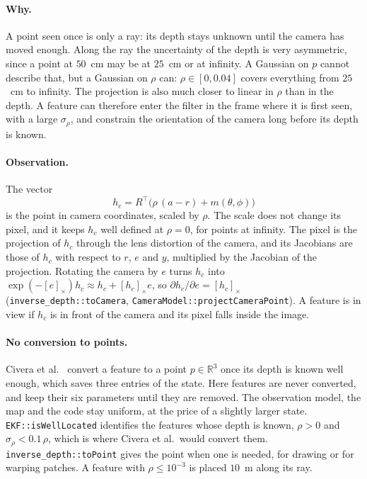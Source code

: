 \documentclass[11pt]{article}
\newcommand{\R}{\mathbb{R}}
\begin{document}
\paragraph{Why.}
A point seen once is only a ray: its depth stays unknown until the camera has moved enough. Along
the ray the uncertainty of the depth is very asymmetric, since a point at $50$~cm may be at $25$~cm
or at infinity. A Gaussian on $p$ cannot describe that, but a Gaussian on $\rho$ can:
$\rho \in [0, 0.04]$ covers everything from $25$~cm to infinity. The projection is also much
closer to linear in $\rho$ than in the depth. A feature can therefore enter the filter in the frame
where it is first seen, with a large $\sigma_\rho$, and constrain the orientation of the camera
long before its depth is known.

\paragraph{Observation.}
The vector
\begin{equation}
  h_c = R^\top \big( \rho\, (a - r) + m(\theta, \phi) \big)
\end{equation}
is the point in camera coordinates, scaled by $\rho$. The scale does not change its pixel, and it
keeps $h_c$ well defined at $\rho = 0$, for points at infinity. The pixel is the projection of $h_c$
through the lens distortion of the camera, and its Jacobians are those of $h_c$ with respect to
$r$, $e$ and $y$, multiplied by the Jacobian of the projection. Rotating the camera by $e$ turns
$h_c$ into $\exp(-[e]_\times) h_c \approx h_c + [h_c]_\times e$, so
$\partial h_c / \partial e = [h_c]_\times$ (\texttt{inverse\_depth::toCamera},
\texttt{CameraModel::projectCameraPoint}). A feature is in view if $h_c$ is in front of the camera
and its pixel falls inside the image.

\paragraph{No conversion to points.}
Civera et al.~\cite{civera2008} convert a feature to a point $p \in \R^3$ once its depth is known
well enough, which saves three entries of the state. Here features are never converted, and
keep their six parameters until they are removed. The observation model, the map and the code stay uniform, at the
price of a slightly larger state. \texttt{EKF::isWellLocated} identifies the features whose depth
is known, $\rho > 0$ and $\sigma_\rho < 0.1\, \rho$, which is where Civera et al.\ would convert
them. \texttt{inverse\_depth::toPoint} gives the point when one is needed, for drawing or for
warping patches. A feature with $\rho \le 10^{-3}$ is placed $10$~m along its ray.
\end{document}
